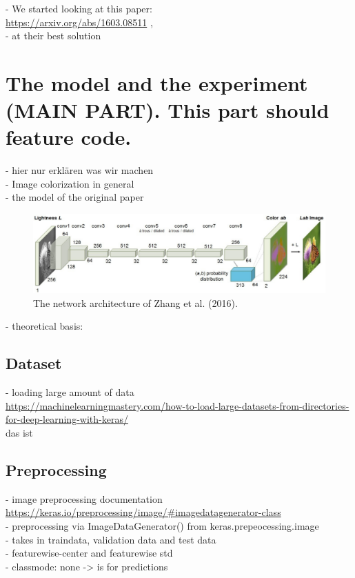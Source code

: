 \documentclass[12pt,letterpaper]{article}
\begin{document}

- We started looking at this paper: \\
\url{https://arxiv.org/abs/1603.08511} , \\
- at their best solution
\section{The model and the experiment (MAIN PART). This part should feature code.}
- hier nur erklären was wir machen\\
- Image colorization in general\\
- the model of the original paper\\
\begin{figure}[ht]
	\centering
	\includegraphics[width=1.0\textwidth]{layer.png}
	\caption{The network architecture of Zhang et al. (2016). }
	\label{fig1}
\end{figure}
- theoretical basis:\\

\subsection{Dataset}
- loading large amount of data\\
\url{https://machinelearningmastery.com/how-to-load-large-datasets-from-directories-for-deep-learning-with-keras/}\\
das ist \citep{Brownlee.2019}
\subsection{Preprocessing}
- image preprocessing documentation\\
\url{https://keras.io/preprocessing/image/#imagedatagenerator-class}\\
- preprocessing via ImageDataGenerator() from keras.prepeocessing.image\\
- takes in traindata, validation data and test data\\
- featurewise-center and featurewise std\\
- classmode: none -> is for predictions\\
\end{document}
